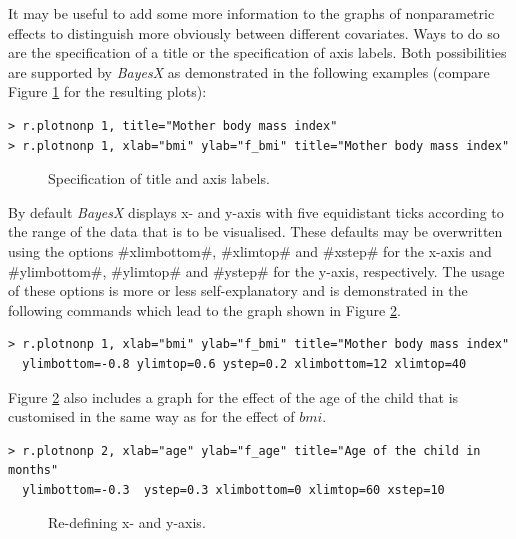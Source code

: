 \documentclass{article}
\begin{document}
It may be useful to add some more information to the graphs of
nonparametric effects to distinguish more obviously between
different covariates. Ways to do so are the specification of a
title or the specification of axis labels. Both possibilities are
supported by {\it BayesX} as demonstrated in the following
examples (compare Figure \ref{bmi4} for the resulting plots):

\begin{verbatim}
> r.plotnonp 1, title="Mother body mass index"
> r.plotnonp 1, xlab="bmi" ylab="f_bmi" title="Mother body mass index"
\end{verbatim}

\begin{figure}[ht]
\begin{center}
\begin{multicols}{2}
\end{multicols}
{\it\caption{Specification of title and axis labels.\label{bmi4}}}
\end{center}
\end{figure}

By default {\it BayesX} displays x- and y-axis with five
equidistant ticks according to the range of the data that is to be
visualised. These defaults may be overwritten using the options
#xlimbottom#, #xlimtop# and #xstep# for the x-axis and
#ylimbottom#, #ylimtop# and #ystep# for the y-axis, respectively.
The usage of these options is more or less self-explanatory and is
demonstrated in the following commands which lead to the graph
shown in Figure \ref{bmi6}.

\begin{verbatim}
> r.plotnonp 1, xlab="bmi" ylab="f_bmi" title="Mother body mass index"
  ylimbottom=-0.8 ylimtop=0.6 ystep=0.2 xlimbottom=12 xlimtop=40
\end{verbatim}

Figure \ref{bmi6} also includes a graph for the effect of the age
of the child that is customised in the same way as for the effect
of $bmi$.

\begin{verbatim}
> r.plotnonp 2, xlab="age" ylab="f_age" title="Age of the child in months"
  ylimbottom=-0.3  ystep=0.3 xlimbottom=0 xlimtop=60 xstep=10
\end{verbatim}

\begin{figure}[ht]
\begin{center}
{\it\caption{Re-defining x- and y-axis.\label{bmi6}}}
\end{center}
\end{figure}
\end{document}
